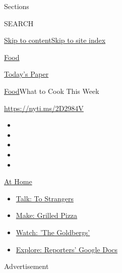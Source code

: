 Sections

SEARCH

\protect\hyperlink{site-content}{Skip to
content}\protect\hyperlink{site-index}{Skip to site index}

\href{https://www.nytimes3xbfgragh.onion/section/food}{Food}

\href{https://myaccount.nytimes3xbfgragh.onion/auth/login?response_type=cookie\&client_id=vi}{}

\href{https://www.nytimes3xbfgragh.onion/section/todayspaper}{Today's
Paper}

\href{/section/food}{Food}\textbar{}What to Cook This Week

\url{https://nyti.ms/2D2984V}

\begin{itemize}
\item
\item
\item
\item
\item
\end{itemize}

\href{https://www.nytimes3xbfgragh.onion/spotlight/at-home?action=click\&pgtype=Article\&state=default\&region=TOP_BANNER\&context=at_home_menu}{At
Home}

\begin{itemize}
\tightlist
\item
  \href{https://www.nytimes3xbfgragh.onion/2020/08/03/well/family/the-benefits-of-talking-to-strangers.html?action=click\&pgtype=Article\&state=default\&region=TOP_BANNER\&context=at_home_menu}{Talk:
  To Strangers}
\item
  \href{https://www.nytimes3xbfgragh.onion/2020/08/01/at-home/coronavirus-make-pizza-on-a-grill.html?action=click\&pgtype=Article\&state=default\&region=TOP_BANNER\&context=at_home_menu}{Make:
  Grilled Pizza}
\item
  \href{https://www.nytimes3xbfgragh.onion/2020/07/31/arts/television/goldbergs-abc-stream.html?action=click\&pgtype=Article\&state=default\&region=TOP_BANNER\&context=at_home_menu}{Watch:
  'The Goldbergs'}
\item
  \href{https://www.nytimes3xbfgragh.onion/interactive/2020/at-home/even-more-reporters-editors-diaries-lists-recommendations.html?action=click\&pgtype=Article\&state=default\&region=TOP_BANNER\&context=at_home_menu}{Explore:
  Reporters' Google Docs}
\end{itemize}

Advertisement

